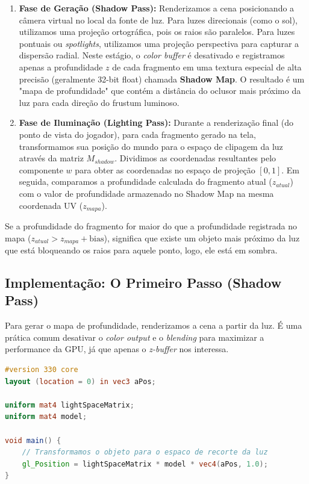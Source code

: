 \begin{enumerate}
    \item \textbf{Fase de Geração (Shadow Pass):} 
    Renderizamos a cena posicionando a câmera virtual no local da fonte de luz. Para luzes direcionais (como o sol), utilizamos uma projeção ortográfica, pois os raios são paralelos. Para luzes pontuais ou \textit{spotlights}, utilizamos uma projeção perspectiva para capturar a dispersão radial. Neste estágio, o \textit{color buffer} é desativado e registramos apenas a profundidade $z$ de cada fragmento em uma textura especial de alta precisão (geralmente 32-bit float) chamada \textbf{Shadow Map}. O resultado é um "mapa de profundidade" que contém a distância do oclusor mais próximo da luz para cada direção do frustum luminoso.
    
    \item \textbf{Fase de Iluminação (Lighting Pass):} 
    Durante a renderização final (do ponto de vista do jogador), para cada fragmento gerado na tela, transformamos sua posição do mundo para o espaço de clipagem da luz através da matriz $M_{shadow}$. Dividimos as coordenadas resultantes pelo componente $w$ para obter as coordenadas no espaço de projeção $[0, 1]$. Em seguida, comparamos a profundidade calculada do fragmento atual ($z_{atual}$) com o valor de profundidade armazenado no Shadow Map na mesma coordenada UV ($z_{mapa}$).
\end{enumerate}

Se a profundidade do fragmento for maior do que a profundidade registrada no mapa ($z_{atual} > z_{mapa} + \text{bias}$), significa que existe um objeto mais próximo da luz que está bloqueando os raios para aquele ponto, logo, ele está em sombra.

\subsection{Implementação: O Primeiro Passo (Shadow Pass)}

Para gerar o mapa de profundidade, renderizamos a cena a partir da luz. É uma prática comum desativar o \textit{color output} e o \textit{blending} para maximizar a performance da GPU, já que apenas o \textit{z-buffer} nos interessa.

\begin{lstlisting}[language=GLSL, caption={Vertex Shader simplificado para geração de Shadow Map}]
#version 330 core
layout (location = 0) in vec3 aPos;

uniform mat4 lightSpaceMatrix;
uniform mat4 model;

void main() {
    // Transformamos o objeto para o espaco de recorte da luz
    gl_Position = lightSpaceMatrix * model * vec4(aPos, 1.0);
}
\end{lstlisting}

